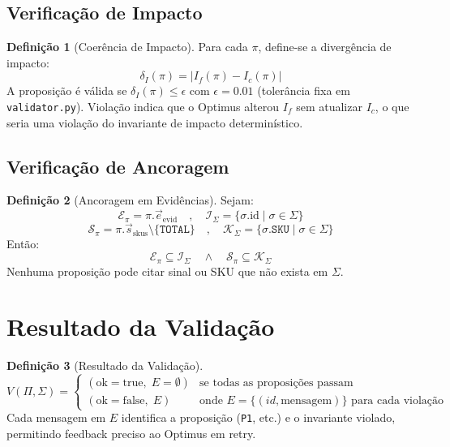 \documentclass[a4paper, 12pt]{report}
\theoremstyle{definition}
\newtheorem{definicao}{Defini\c{c}\~ao}[chapter]
\theoremstyle{remark}
\newcommand{\sku}{\texttt{SKU}}
\begin{document}
\subsection{Verifica\c{c}\~ao de Impacto}

\begin{definicao}[Coer\^encia de Impacto]
  Para cada $\pi$, define-se a diverg\^encia de impacto:
  \[
    \delta_I(\pi) = |I_f(\pi) - I_c(\pi)|
  \]
  A proposi\c{c}\~ao \'e v\'alida se $\delta_I(\pi) \leq \epsilon$ com
  $\epsilon = 0.01$ (toler\^ancia fixa em \texttt{validator.py}).
  Viola\c{c}\~ao indica que o Optimus alterou $I_f$ sem atualizar $I_c$,
  o que seria uma viola\c{c}\~ao do invariante de impacto determin\'istico.
\end{definicao}


\subsection{Verifica\c{c}\~ao de Ancoragem}

\begin{definicao}[Ancoragem em Evid\^encias]
  Sejam:
  \[
    \mathcal{E}_\pi = \pi.\vec{e}_{\text{evid}} \quad,\quad
    \mathcal{I}_\Sigma = \{\sigma.\text{id} \mid \sigma \in \Sigma\}
  \]
  \[
    \mathcal{S}_\pi = \pi.\vec{s}_{\text{skus}} \setminus \{\texttt{TOTAL}\} \quad,\quad
    \mathcal{K}_\Sigma = \{\sigma.\sku \mid \sigma \in \Sigma\}
  \]
  Ent\~ao:
  \[
    \mathcal{E}_\pi \subseteq \mathcal{I}_\Sigma
    \quad \land \quad
    \mathcal{S}_\pi \subseteq \mathcal{K}_\Sigma
  \]
  Nenhuma proposi\c{c}\~ao pode citar sinal ou SKU que n\~ao exista em $\Sigma$.
\end{definicao}


\section{Resultado da Valida\c{c}\~ao}

\begin{definicao}[Resultado da Valida\c{c}\~ao]
  \[
    V(\Pi, \Sigma) = \begin{cases}
      (\text{ok}=\text{true},\; E=\emptyset) &
        \text{se todas as proposi\c{c}\~oes passam} \\[6pt]
      (\text{ok}=\text{false},\; E) &
        \text{onde } E = \{(id, \text{mensagem})\} \text{ para cada viola\c{c}\~ao}
    \end{cases}
  \]
  Cada mensagem em $E$ identifica a proposi\c{c}\~ao (\texttt{P1}, etc.)
  e o invariante violado, permitindo feedback preciso ao Optimus em retry.
\end{definicao}
\end{document}
